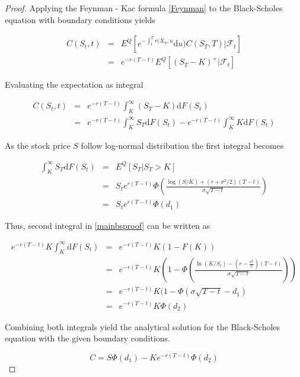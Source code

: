 \documentclass[12pt, oneside]{book}
\theoremstyle{plain}
\theoremstyle{definition}
\begin{document}
\begin{proof}
Applying the Feynman - Kac formula \ref{Feynman} to the Black-Scholes equation with boundary conditions yields

\begin{eqnarray}
C(S_t, t) &=& E^Q [ e^{-  \int_{t}^{T} r(X_u, u} \mathrm{d}u) C(S_T, T) \lvert \mathcal{F}_t]\\
&=& e^{-r (T-t)}  E^Q [(S_T - K)^+ \lvert \mathcal{F}_t]
\end{eqnarray}

Evaluating the expectation as integral

\begin{eqnarray}\label{mainbsproof}
C(S_t, t) &=& e^{-r (T-t)}  \int_K^{\infty} (S_T - K) \mathrm{d}F(S_t) \\
&=& e^{-r (T-t)}\int_K^{\infty} S_T \mathrm{d}F(S_t) - e^{-r (T-t)} \int_K^{\infty} K \mathrm{d}F(S_t)
\end{eqnarray}

As the stock price $S$ follow log-normal distribution \cite{hull} the first integral becomes

\begin{eqnarray}
\int_K^{\infty} S_T \mathrm{d}F(S_t) &=& E^Q[S_T \lvert S_T > K]\\
&=& S_t e^{r (T-t)} \Phi( \frac{\log(S/K) + (r + \sigma^2/2)(T - t)}{\sigma \sqrt{T-t}}) \\
&=& S_t e^{r (T-t)} \Phi(d_1)
\end{eqnarray}

Thus, second integral in \ref{mainbsproof} can be written as

\begin{eqnarray}
e^{-r (T-t)} K \int_K^{\infty} \mathrm{d}F(S_t) &=& e^{-r (T-t)} K (1 - F(K)) \\
&=& e^{-r (T-t)}  K (1 - \Phi(\frac{\ln (K/S_t) - (r - \frac{\sigma^2}{2})(T- t)}{\sigma \sqrt{T - t}}))\\
&=& e^{-r (T-t)}  K (1 - \Phi( \sigma \sqrt{T-t} - d_1) \\
&=& e^{-r (T-t)}  K \Phi(d_2) 
\end{eqnarray}

Combining both integrals yield the analytical solution for the Black-Scholes equation with the given boundary conditions.

\begin{equation}
C = S \Phi (d_1) - K e^{-r(T-t)} \Phi (d_2)
\end{equation}
\end{proof}
\end{document}
